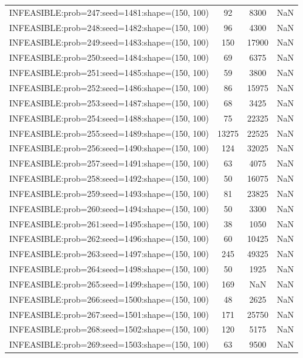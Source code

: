 \begin{longtable}{lccc}
INFEASIBLE:prob=247:seed=1481:shape=(150, 100) &    92 &  8300 &    NaN \\
INFEASIBLE:prob=248:seed=1482:shape=(150, 100) &    96 &  4300 &    NaN \\
INFEASIBLE:prob=249:seed=1483:shape=(150, 100) &   150 & 17900 &    NaN \\
INFEASIBLE:prob=250:seed=1484:shape=(150, 100) &    69 &  6375 &    NaN \\
INFEASIBLE:prob=251:seed=1485:shape=(150, 100) &    59 &  3800 &    NaN \\
INFEASIBLE:prob=252:seed=1486:shape=(150, 100) &    86 & 15975 &    NaN \\
INFEASIBLE:prob=253:seed=1487:shape=(150, 100) &    68 &  3425 &    NaN \\
INFEASIBLE:prob=254:seed=1488:shape=(150, 100) &    75 & 22325 &    NaN \\
INFEASIBLE:prob=255:seed=1489:shape=(150, 100) & 13275 & 22525 &    NaN \\
INFEASIBLE:prob=256:seed=1490:shape=(150, 100) &   124 & 32025 &    NaN \\
INFEASIBLE:prob=257:seed=1491:shape=(150, 100) &    63 &  4075 &    NaN \\
INFEASIBLE:prob=258:seed=1492:shape=(150, 100) &    50 & 16075 &    NaN \\
INFEASIBLE:prob=259:seed=1493:shape=(150, 100) &    81 & 23825 &    NaN \\
INFEASIBLE:prob=260:seed=1494:shape=(150, 100) &    50 &  3300 &    NaN \\
INFEASIBLE:prob=261:seed=1495:shape=(150, 100) &    38 &  1050 &    NaN \\
INFEASIBLE:prob=262:seed=1496:shape=(150, 100) &    60 & 10425 &    NaN \\
INFEASIBLE:prob=263:seed=1497:shape=(150, 100) &   245 & 49325 &    NaN \\
INFEASIBLE:prob=264:seed=1498:shape=(150, 100) &    50 &  1925 &    NaN \\
INFEASIBLE:prob=265:seed=1499:shape=(150, 100) &   169 &   NaN &    NaN \\
INFEASIBLE:prob=266:seed=1500:shape=(150, 100) &    48 &  2625 &    NaN \\
INFEASIBLE:prob=267:seed=1501:shape=(150, 100) &   171 & 25750 &    NaN \\
INFEASIBLE:prob=268:seed=1502:shape=(150, 100) &   120 &  5175 &    NaN \\
INFEASIBLE:prob=269:seed=1503:shape=(150, 100) &    63 &  9500 &    NaN \\

\end{longtable}
